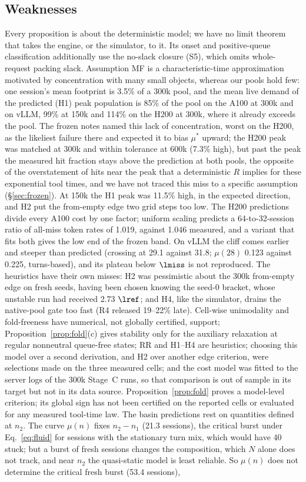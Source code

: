 \subsection{Weaknesses}\label{sec:fp-weak}
Every proposition is about the deterministic model; we have no limit theorem that takes the engine, or the simulator, to it. Its onset and positive-queue classification additionally use the no-slack closure (S5), which omits whole-request packing slack. Assumption MF is a characteristic-time approximation motivated by concentration with many small objects, whereas our pools hold few: one session's mean footprint is 3.5\% of a 300k pool, and the mean live demand of the predicted (H1) peak population is 85\% of the pool on the A100 at 300k and on vLLM, 99\% at 150k and 114\% on the H200 at 300k, where it already exceeds the pool. The frozen notes named this lack of concentration, worst on the H200, as the likeliest failure there and expected it to bias $\mu^*$ upward; the H200 peak was matched at 300k and within tolerance at 600k (7.3\% high), but past the peak the measured hit fraction stays above the prediction at both pools, the opposite of the overstatement of hits near the peak that a deterministic $R$ implies for these exponential tool times, and we have not traced this miss to a specific assumption (\S\ref{sec:frozen}). At 150k the H1 peak was 11.5\% high, in the expected direction, and H2 put the from-empty edge two grid steps too low. The H200 predictions divide every A100 cost by one factor; uniform scaling predicts a 64-to-32-session ratio of all-miss token rates of 1.019, against 1.046 measured, and a variant that fits both gives the low end of the frozen band. On vLLM the cliff comes earlier and steeper than predicted (crossing at 29.1 against 31.8; $\mu(28)$ 0.123 against 0.225\sps, turns-based), and its plateau below $\lmiss$ is not reproduced. The heuristics have their own misses: H2 was pessimistic about the 300k from-empty edge on fresh seeds, having been chosen knowing the seed-0 bracket, whose unstable run had received 2.73 $\lref$; and H4, like the simulator, drains the native-pool gate too fast (R4 released 19--22\% late). Cell-wise unimodality and fold-freeness have numerical, not globally certified, support; Proposition~\ref{prop:fold}(c) gives stability only for the auxiliary relaxation at regular nonneutral queue-free states; RR and H1--H4 are heuristics; choosing this model over a second derivation, and H2 over another edge criterion, were selections made on the three measured cells; and the cost model was fitted to the server logs of the 300k Stage~C runs, so that comparison is out of sample in its target but not in its data source. Proposition~\ref{prop:fold} proves a model-level criterion; its global sign has not been certified on the reported cells or evaluated for any measured tool-time law. The basin predictions rest on quantities defined at $n_2$. The curve $\mu(n)$ fixes $n_2-n_1$ (21.3 sessions), the critical burst under Eq.~\eqref{eq:fluid} for sessions with the stationary turn mix, which would have 40 stuck; but a burst of fresh sessions changes the composition, which $N$ alone does not track, and near $n_2$ the quasi-static model is least reliable. So $\mu(n)$ does not determine the critical fresh burst (53.4 sessions), 